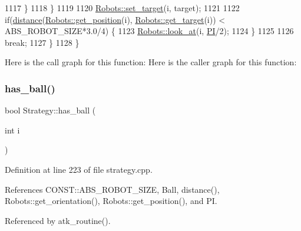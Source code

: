 \begin{DoxyCode}
1117                 \}
1118             \}
1119 
1120             \hyperlink{class_robots_ac1cd5c41b6e5d5643b2186ca51699c8f}{Robots::set\_target}(i, target);
1121 
1122             \textcolor{keywordflow}{if}(\hyperlink{class_strategy_aacce05caed71553c4efd2d28c9c3aa39}{distance}(\hyperlink{class_robots_a1fca8f2f5070176faa6ba1efa2f1ff14}{Robots::get\_position}(i), 
      \hyperlink{class_robots_a8a4fe339df4823e45cf34d9fb8daa64b}{Robots::get\_target}(i)) < ABS\_ROBOT\_SIZE*3.0/4) \{
1123                 \hyperlink{class_robots_a3b307142c41d7adc7614e6e4f2caf16b}{Robots::look\_at}(i, \hyperlink{strategy_8cpp_a598a3330b3c21701223ee0ca14316eca}{PI}/2);
1124             \}
1125 
1126             \textcolor{keywordflow}{break};
1127     \}
1128 \}
\end{DoxyCode}
Here is the call graph for this function\+:
Here is the caller graph for this function\+:
\mbox{\label{class_strategy_af607e7b52f48a6c490549898e752fda2}} 
\subsubsection{\texorpdfstring{has\+\_\+ball()}{has\_ball()}}
{\footnotesize\ttfamily bool Strategy\+::has\+\_\+ball (\begin{DoxyParamCaption}\item[{int}]{i }\end{DoxyParamCaption})}



Definition at line 223 of file strategy.\+cpp.



References C\+O\+N\+S\+T\+::\+A\+B\+S\+\_\+\+R\+O\+B\+O\+T\+\_\+\+S\+I\+ZE, Ball, distance(), Robots\+::get\+\_\+orientation(), Robots\+::get\+\_\+position(), and PI.



Referenced by atk\+\_\+routine().



